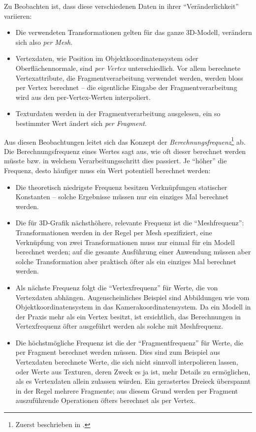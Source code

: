 \documentclass[twoside,a4paper,fleqn,12pt]{article}
\begin{document}
Zu Beobachten ist, dass diese verschiedenen Daten in ihrer "`Veränderlichkeit"' variieren:
\begin{itemize}
\item Die verwendeten Transformationen gelten für das ganze 3D-Modell, verändern sich also \emph{per Mesh}.
\item Vertexdaten, wie Position im Objektkoordinatensystem oder Oberflächennormale, sind \emph{per Vertex}
unterschiedlich. Vor allem berechnete Vertexattribute, die Fragmentverarbeitung verwendet werden, werden
bloss per Vertex berechnet -- die eigentliche Eingabe der Fragmentverarbeitung wird aus den per-Vertex-Werten
interpoliert.
\item Texturdaten werden in der Fragmentverarbeitung ausgelesen, ein so bestimmter Wert ändert sich \emph{per Fragment}.
\end{itemize}

Aus diesen Beobachtungen leitet sich das Konzept der \emph{Berechnungsfrequenz}\footnote{Zuerst beschrieben in \cite{stanford_rtsl}.} ab.
Die Berechnungsfrequenz eines Wertes sagt aus, wie oft dieser berechnet werden müsste bzw. in welchem Verarbeitungsschritt
dies passiert. Je "`höher"' die Frequenz, desto häufiger muss ein Wert potentiell berechnet werden:
\begin{itemize}
\item Die theoretisch niedrigste Frequenz besitzen Verknüpfungen statischer Konstanten -- solche Ergebnisse müssen nur ein einziges Mal berechnet werden.
\item Die für 3D-Grafik nächsthöhere, relevante Frequenz ist die "`Meshfrequenz"': Transformationen werden in der Regel per Mesh spezifiziert,
eine Verknüpfung von zwei Transformationen muss nur einmal für ein Modell berechnet werden; auf die gesamte Ausführung einer Anwendung
müssen aber solche Transformation aber praktisch öfter als ein einziges Mal berechnet werden.
\item Als nächste Frequenz folgt die "`Vertexfrequenz"' für Werte, die von Vertexdaten abhängen. Augenscheinliches Beispiel sind Abbildungen
wie vom Objektkoordinatensystem in das Kamerakoordinatensystem. Da ein Modell in der Praxis mehr als ein Vertex besitzt,
ist ersichtlich, das Berechnungen in Vertexfrequenz öfter ausgeführt werden als solche mit Meshfrequenz.
\item Die höchstmögliche Frequenz ist die der "`Fragmentfrequenz"' für Werte, die per Fragment berechnet werden müssen.
Dies sind zum Beispiel aus Vertexdaten berechnete Werte, die sich nicht sinnvoll interpolieren lassen, oder Werte aus Texturen,
deren Zweck es ja ist, mehr Details zu ermöglichen, als es Vertexdaten allein zulassen würden.
Ein gerastertes Dreieck überspannt in der Regel mehrere Fragmente; aus diesem Grund werden per Fragment auszuführende Operationen
öfters berechnet als per Vertex.
\end{itemize}
\end{document}
